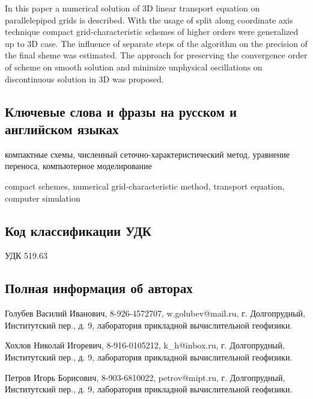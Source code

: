 \documentclass[11pt]{article}
\begin{document}
In this paper a numerical solution of 3D linear transport equation on parallelepiped grids is described.
With the usage of split along coordinate axis technique compact grid-characteristic schemes of higher orders were generalized up to 3D case.
The influence of separate steps of the algorithm on the precision of the final sheme was estimated.
The approach for preserving the convergence order of scheme on smooth solution and minimize unphysical oscillations on discontinuous solution in 3D was proposed.

\subsection {Ключевые слова и фразы на русском и английском языках}

компактные схемы, численный сеточно-характеристический метод, уравнение переноса, компьютерное моделирование

compact schemes, numerical grid-characteristic method, transport equation, computer simulation

\subsection {Код классификации УДК}

УДК 519.63

\subsection {Полная информация об авторах}

Голубев Василий Иванович, 8-926-4572707, w.golubev@mail.ru, г. Долгопрудный, Институтский пер., д. 9, лаборатория прикладной вычислительной геофизики.

Хохлов Николай Игоревич, 8-916-0105212, k\_h@inbox.ru, г. Долгопрудный, Институтский пер., д. 9, лаборатория прикладной вычислительной геофизики.

Петров Игорь Борисович, 8-903-6810022, petrov@mipt.ru, г. Долгопрудный, Институтский пер., д. 9, лаборатория прикладной вычислительной геофизики.
\end{document}
